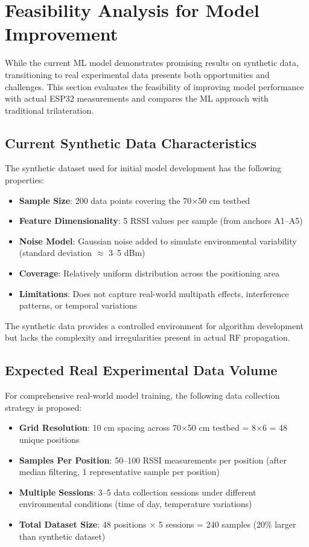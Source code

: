 \section{Feasibility Analysis for Model Improvement}
\label{sec:feasibility_analysis}

While the current ML model demonstrates promising results on synthetic data, transitioning to real experimental data presents both opportunities and challenges. This section evaluates the feasibility of improving model performance with actual ESP32 measurements and compares the ML approach with traditional trilateration.

\subsection{Current Synthetic Data Characteristics}

The synthetic dataset used for initial model development has the following properties:

\begin{itemize}
    \item \textbf{Sample Size}: 200 data points covering the 70×50 cm testbed
    \item \textbf{Feature Dimensionality}: 5 RSSI values per sample (from anchors A1--A5)
    \item \textbf{Noise Model}: Gaussian noise added to simulate environmental variability (standard deviation $\approx$ 3--5 dBm)
    \item \textbf{Coverage}: Relatively uniform distribution across the positioning area
    \item \textbf{Limitations}: Does not capture real-world multipath effects, interference patterns, or temporal variations
\end{itemize}

The synthetic data provides a controlled environment for algorithm development but lacks the complexity and irregularities present in actual RF propagation.

\subsection{Expected Real Experimental Data Volume}

For comprehensive real-world model training, the following data collection strategy is proposed:

\begin{itemize}
    \item \textbf{Grid Resolution}: 10 cm spacing across 70×50 cm testbed = 8×6 = 48 unique positions
    \item \textbf{Samples Per Position}: 50--100 RSSI measurements per position (after median filtering, 1 representative sample per position)
    \item \textbf{Multiple Sessions}: 3--5 data collection sessions under different environmental conditions (time of day, temperature variations)
    \item \textbf{Total Dataset Size}: 48 positions × 5 sessions = 240 samples (20\% larger than synthetic dataset)
\end{itemize}


